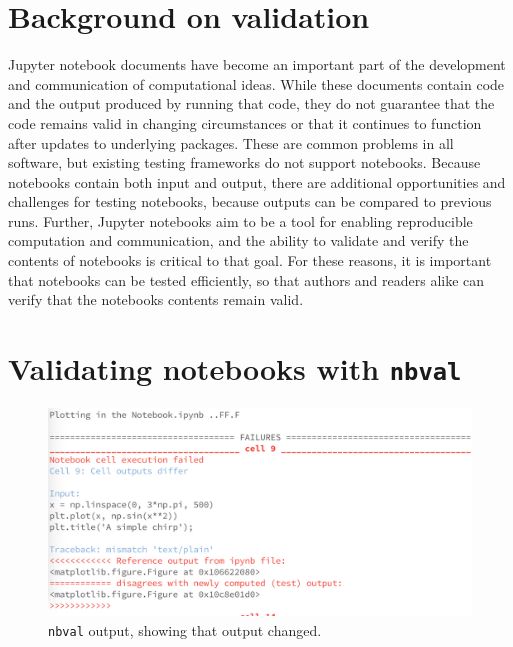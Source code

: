 \documentclass{deliverablereport}
\author{Martin Sandve Aln\ae{}s \& Hans Fangohr \& Vidar Fauske \& Thomas Kluyver \& Benjamin Ragan-Kelley \& MORE?}
\begin{document}
\maketitle
%
\strut\githubissuedescription
\newpage\tableofcontents\newpage

\newcommand{\nbval}{\texttt{nbval} }

\section{Background on validation} %

Jupyter notebook documents have become an important part of the development and communication of computational ideas.
While these documents contain code and the output produced by running that code,
they do not guarantee that the code remains valid in changing circumstances or that it continues to function after updates to underlying packages.
These are common problems in all software, but existing testing frameworks do not support notebooks.
Because notebooks contain both input and output, there are additional opportunities and challenges for testing notebooks,
because outputs can be compared to previous runs.
Further, Jupyter notebooks aim to be a tool for enabling reproducible computation and communication,
and the ability to validate and verify the contents of notebooks is critical to that goal.
For these reasons, it is important that notebooks can be tested efficiently,
so that authors and readers alike can verify that the notebooks contents remain valid.


\section{Validating notebooks with \nbval} %

\begin{figure}[ht]
  \centering
  \includegraphics[width=.7\textwidth]{img/nbval-terminal}
  \caption{\nbval output, showing that output changed.}\label{fig:nbval}
\end{figure}
\end{document}

